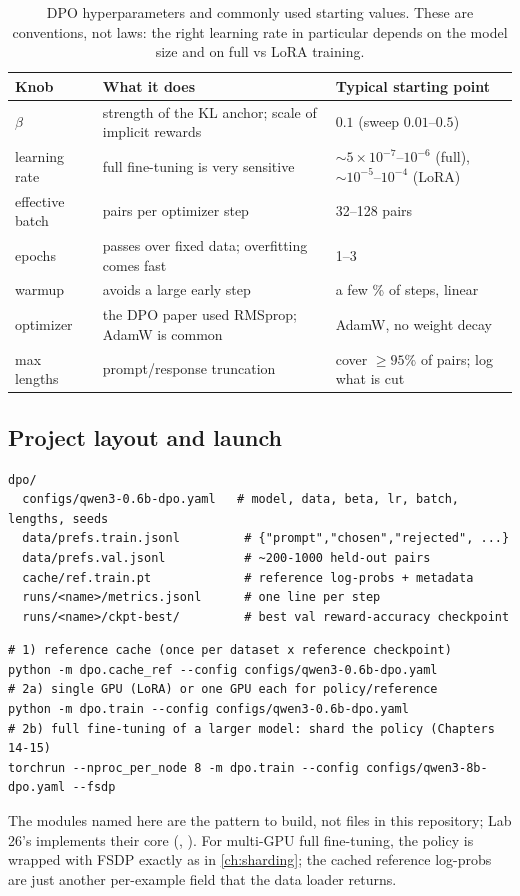 \begin{table}[h]
\centering\small
\begin{tabularx}{\linewidth}{@{}lXl@{}}
\toprule
\textbf{Knob} & \textbf{What it does} & \textbf{Typical starting point}\\
\midrule
$\beta$ & strength of the KL anchor; scale of implicit rewards & $0.1$ (sweep $0.01$--$0.5$)\\
learning rate & full fine-tuning is very sensitive & $\sim 5\times10^{-7}$--$10^{-6}$ (full), $\sim10^{-5}$--$10^{-4}$ (LoRA)\\
effective batch & pairs per optimizer step & 32--128 pairs\\
epochs & passes over fixed data; overfitting comes fast & 1--3\\
warmup & avoids a large early step & a few \% of steps, linear\\
optimizer & the DPO paper used RMSprop; AdamW is common & AdamW, no weight decay\\
max lengths & prompt/response truncation & cover $\geq95\%$ of pairs; log what is cut\\
\bottomrule
\end{tabularx}
\caption{DPO hyperparameters and commonly used starting values. These are conventions, not laws:
the right learning rate in particular depends on the model size and on full vs LoRA training.}
\label{tab:dpo:hparams}
\end{table}

\subsection{Project layout and launch}

\begin{lstlisting}[style=plain]
dpo/
  configs/qwen3-0.6b-dpo.yaml   # model, data, beta, lr, batch, lengths, seeds
  data/prefs.train.jsonl         # {"prompt","chosen","rejected", ...}
  data/prefs.val.jsonl           # ~200-1000 held-out pairs
  cache/ref.train.pt             # reference log-probs + metadata
  runs/<name>/metrics.jsonl      # one line per step
  runs/<name>/ckpt-best/         # best val reward-accuracy checkpoint
\end{lstlisting}

\begin{lstlisting}[style=shell]
# 1) reference cache (once per dataset x reference checkpoint)
python -m dpo.cache_ref --config configs/qwen3-0.6b-dpo.yaml
# 2a) single GPU (LoRA) or one GPU each for policy/reference
python -m dpo.train --config configs/qwen3-0.6b-dpo.yaml
# 2b) full fine-tuning of a larger model: shard the policy (Chapters 14-15)
torchrun --nproc_per_node 8 -m dpo.train --config configs/qwen3-8b-dpo.yaml --fsdp
\end{lstlisting}
The modules named here are the pattern to build, not files in this repository; Lab 26's
 implements their core (,
). For multi-GPU full fine-tuning, the policy is wrapped with FSDP exactly
as in \cref{ch:sharding}; the cached reference log-probs are just another per-example field
that the data loader returns.

